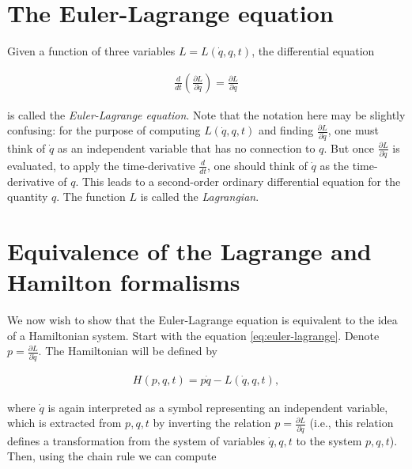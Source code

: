 \documentclass[11pt]{report}
\theoremstyle{plain}
\theoremstyle{definition}
\begin{document}
\section{The Euler-Lagrange equation}

Given a function of three variables
$L=L(\dot{q},q,t)$, the differential equation

\begin{equation*} \tag{4}\label{eq:euler-lagrange}
\begin{split}
\frac{d}{dt}\left( \frac{\partial L}{\partial \dot{q}} \right) = \frac{\partial L}{\partial q}
\end{split}
\end{equation*}

\noindent is called the \emph{Euler-Lagrange equation}. Note that the
notation here may be slightly confusing: for the
purpose of computing $L(\dot{q},q,t)$ and finding
$\frac{\partial L}{\partial \dot{q}}$, one must think
of $\dot{q}$ as an independent variable that has no
connection to $q$. But once
$\frac{\partial L}{\partial \dot{q}}$ is evaluated, to
apply the time-derivative $\frac{d}{dt}$, one should
think of $\dot{q}$ as the time-derivative of $q$. This
leads to a second-order ordinary differential equation
for the quantity $q$. The function $L$ is called the
\emph{Lagrangian}.

\section{Equivalence of the Lagrange and Hamilton formalisms}

We now wish to show that the Euler-Lagrange equation
is equivalent to the idea of a Hamiltonian system.
Start with the equation \eqref{eq:euler-lagrange}. Denote
$p=\frac{\partial L}{\partial \dot{q}}$. The
Hamiltonian will be defined by

\begin{equation*} \tag{5}\label{eq:hamilton-lagrange}
\begin{split}
H(p,q,t) = p\dot{q} - L(\dot{q}, q, t),
\end{split}
\end{equation*}

\noindent where $\dot{q}$ is again interpreted as a symbol
representing an independent variable, which is
extracted from $p, q, t$ by inverting the relation
$p=\frac{\partial L}{\partial \dot{q}}$ (i.e., this
relation defines a transformation from the system of
variables $\dot{q},q,t$ to the system $p,q,t$). Then,
using the chain rule we can compute
\end{document}
